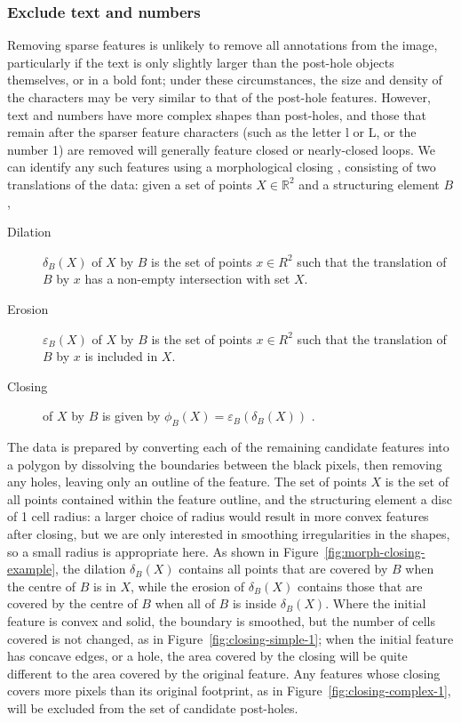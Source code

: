 \documentclass[../../ArchStats.tex]{subfiles}
\begin{document}
\subsubsection{Exclude text and numbers}
\label{sec:closing}

Removing sparse features is unlikely to remove all annotations from the image, particularly if the text is only slightly larger than the post-hole objects themselves, or in a bold font; under these circumstances, the size and density of the characters may be very similar to that of the post-hole features. However, text and numbers have more complex shapes than post-holes, and those that remain after the sparser feature characters (such as the letter l or L, or the number 1) are removed will generally feature closed or nearly-closed loops. We can identify any such features using a morphological closing \cite{Serra1982}, consisting of two translations of the data: given a set of points $X \in \mathbb{R}^2$ and a structuring element $B$,

\begin{description}
\item[Dilation] $\delta_B(X)$ of $X$ by $B$ is the set of points $x \in R^2$ such that the translation of $B$ by $x$ has a non-empty intersection with set $X$.
\vspace{-25pt}
\item[Erosion] $\varepsilon_B(X)$ of $X$ by $B$ is the set of points $x \in R^2$ such that the translation of $B$ by $x$ is included in $X$.
\vspace{-25pt}
\item[Closing] of $X$ by $B$ is given by $\phi_B(X) = \varepsilon_B(\delta_B(X))$ \cite{Vincent1997}.
\end{description}


The data is prepared by converting each of the remaining candidate features into a polygon by dissolving the boundaries between the black pixels, then removing any holes, leaving only an outline of the feature. The set of points $X$ is the set of all points contained within the feature outline, and the structuring element a disc of 1 cell radius: a larger choice of radius would result in more convex features after closing, but we are only interested in smoothing irregularities in the shapes, so a small radius is appropriate here. As shown in Figure~\ref{fig:morph-closing-example}, the dilation $\delta_B(X)$ contains all points that are covered by $B$ when the centre of $B$ is in $X$, while the erosion of $\delta_B(X)$ contains those that are covered by the centre of $B$ when all of $B$ is inside $\delta_B(X)$. Where the initial feature is convex and solid, the boundary is smoothed, but the number of cells covered is not changed, as in Figure~\ref{fig:closing-simple-1}; when the initial feature has concave edges, or a hole, the area covered by the closing will be quite different to the area covered by the original feature. Any features whose closing covers more pixels than its original footprint, as in Figure~\ref{fig:closing-complex-1}, will be excluded from the set of candidate post-holes.
\end{document}
